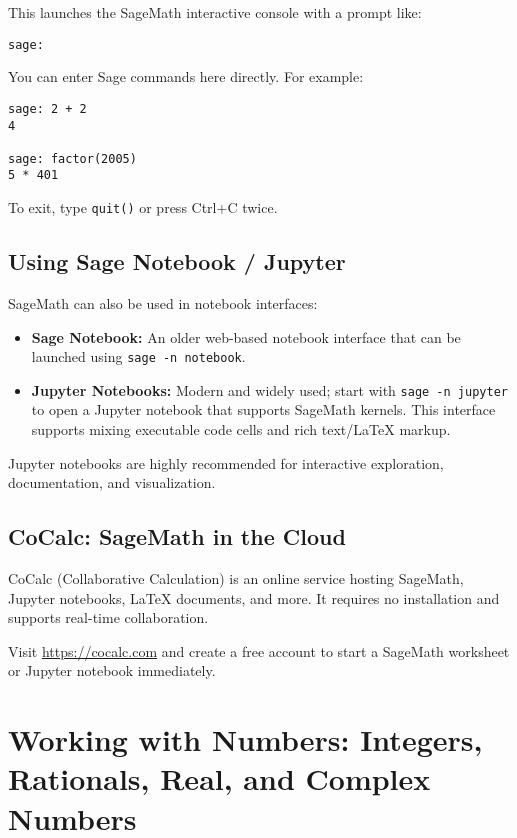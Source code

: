 \documentclass[12pt]{book}
\begin{document}
This launches the SageMath interactive console with a prompt like:

\begin{verbatim}
sage: 
\end{verbatim}

You can enter Sage commands here directly. For example:

\begin{verbatim}
sage: 2 + 2
4

sage: factor(2005)
5 * 401
\end{verbatim}

To exit, type \texttt{quit()} or press Ctrl+C twice.

\section{Using Sage Notebook / Jupyter}

SageMath can also be used in notebook interfaces:

\begin{itemize}
  \item \textbf{Sage Notebook:} An older web-based notebook interface that can be launched using \texttt{sage -n notebook}.
  \item \textbf{Jupyter Notebooks:} Modern and widely used; start with \texttt{sage -n jupyter} to open a Jupyter notebook that supports SageMath kernels. This interface supports mixing executable code cells and rich text/LaTeX markup.
\end{itemize}

Jupyter notebooks are highly recommended for interactive exploration, documentation, and visualization.

\section{CoCalc: SageMath in the Cloud}

CoCalc (Collaborative Calculation) is an online service hosting SageMath, Jupyter notebooks, \LaTeX{} documents, and more. It requires no installation and supports real-time collaboration.

Visit \url{https://cocalc.com} and create a free account to start a SageMath worksheet or Jupyter notebook immediately.

\chapter{Working with Numbers: Integers, Rationals, Real, and Complex Numbers}
\end{document}
